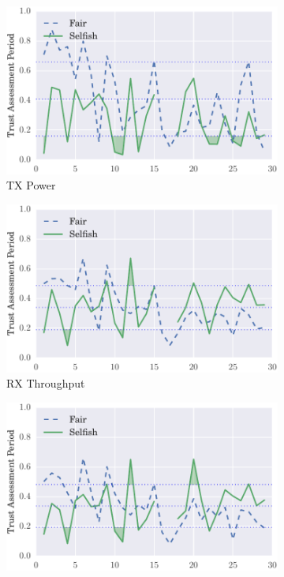 \documentclass[runningheads,a4paper]{llncs}
\begin{document}
\begin{figure}
\begin{subfigure}{0.32\textwidth}
  \includegraphics[width=.95\linewidth]{img/trust_bella_all_mobile_emph_ATXP_BadMouthingPowerControl.pdf}
  \caption{TX Power}
  \label{fig:all_mobile_badmouthing_txp}
\end{subfigure}
\begin{subfigure}{0.32\textwidth}
\centering
  \includegraphics[width=.95\linewidth]{img/trust_bella_all_mobile_emph_RXThroughput_BadMouthingPowerControl.pdf}
  \caption{RX Throughput}
  \label{fig:all_mobile_badmouthing_rxthroughput}
\end{subfigure}
\begin{subfigure}{0.32\textwidth}
\centering
  \includegraphics[width=.95\linewidth]{img/trust_bella_all_mobile_emph_TXThroughput_BadMouthingPowerControl.pdf}

\end{subfigure}
\end{figure}
\end{document}
